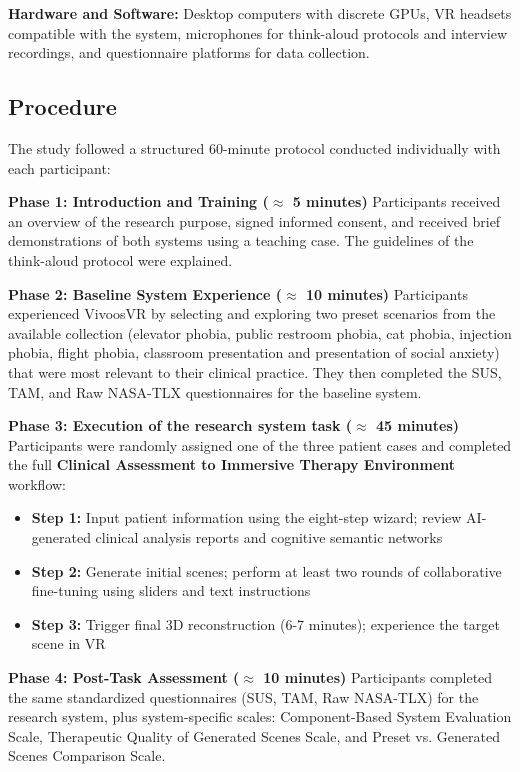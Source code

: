 \documentclass[]{interact}
\begin{document}
\textbf{Hardware and Software:} Desktop computers with discrete GPUs, VR headsets compatible with the system, microphones for think-aloud protocols and interview recordings, and questionnaire platforms for data collection.

\subsection{Procedure}

The study followed a structured 60-minute protocol conducted individually with each participant:

\textbf{Phase 1: Introduction and Training ($\approx$ 5 minutes)}
Participants received an overview of the research purpose, signed informed consent, and received brief demonstrations of both systems using a teaching case. The guidelines of the think-aloud protocol were explained.

\textbf{Phase 2: Baseline System Experience ($\approx$ 10 minutes)}
Participants experienced VivoosVR by selecting and exploring two preset scenarios from the available collection (elevator phobia, public restroom phobia, cat phobia, injection phobia, flight phobia, classroom presentation and presentation of social anxiety) that were most relevant to their clinical practice. They then completed the SUS, TAM, and Raw NASA-TLX questionnaires for the baseline system.

\textbf{Phase 3: Execution of the research system task ($\approx$ 45 minutes)}
Participants were randomly assigned one of the three patient cases and completed the full \textbf{Clinical Assessment to Immersive Therapy Environment} workflow:
\begin{itemize}
    \item \textbf{Step 1:} Input patient information using the eight-step wizard; review AI-generated clinical analysis reports and cognitive semantic networks
    \item \textbf{Step 2:} Generate initial scenes; perform at least two rounds of collaborative fine-tuning using sliders and text instructions
    \item \textbf{Step 3:} Trigger final 3D reconstruction (6-7 minutes); experience the target scene in VR
\end{itemize}

\textbf{Phase 4: Post-Task Assessment ($\approx$ 10 minutes)}
Participants completed the same standardized questionnaires (SUS, TAM, Raw NASA-TLX) for the research system, plus system-specific scales: Component-Based System Evaluation Scale, Therapeutic Quality of Generated Scenes Scale, and Preset vs. Generated Scenes Comparison Scale.
\end{document}
